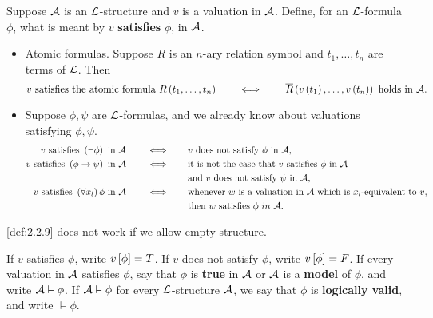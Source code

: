 \begin{definition}
\label{def:2.2.9}
Suppose $ \AA $ is an $ \LL $-structure and $ v $ is a valuation in $ \AA $. Define, for an $ \LL $-formula $ \phi $, what is meant by $ v $ \textbf{satisfies} $ \phi $, in $ \AA $.
\begin{itemize}
\item Atomic formulas. Suppose $ R $ is an $ n $-ary relation symbol and $ t_1, \dots, t_n $ are terms of $ \LL $. Then
$$ v \ \text{satisfies the atomic formula} \ R\rb{t_1, \dots, t_n} \qquad \iff \qquad \overline{R}\rb{v\rb{t_1}, \dots, v\rb{t_n}} \ \text{holds in} \ \AA. $$
\item Suppose $ \phi, \psi $ are $ \LL $-formulas, and we already know about valuations satisfying $ \phi, \psi $.
\begin{align*}
v \ \text{satisfies} \ \notb{\phi} \ \text{in} \ \AA \qquad \iff \qquad & v \ \text{does not satisfy} \ \phi \ \text{in} \ \AA, \\
v \ \text{satisfies} \ \impb{\phi}{\psi} \ \text{in} \ \AA \qquad \iff \qquad & \text{it is not the case that} \ v \ \text{satisfies} \ \phi \ \text{in} \ \AA \\
& \text{and} \ v \ \text{does not satisfy} \ \psi \ \text{in} \ \AA, \\
v \ \text{satisfies} \ \fab{x_l}\phi \ \text{in} \ \AA \qquad \iff \qquad & \text{whenever} \ w \ \text{is a valuation in} \ \AA \ \text{which is} \ x_l \text{-equivalent to} \ v, \\
& \text{then} \ w \ \text{satisfies} \ \phi \ in \ \AA.
\end{align*}
\end{itemize}
\end{definition}


\begin{remark2}
\ref{def:2.2.9} does not work if we allow empty structure.
\end{remark2}

\begin{notation2}
If $ v $ satisfies $ \phi $, write $ v\sb{\phi} = T $. If $ v $ does not satisfy $ \phi $, write $ v\sb{\phi} = F $. If every valuation in $ \AA $ satisfies $ \phi $, say that $ \phi $ is \textbf{true} in $ \AA $ or $ \AA $ is a \textbf{model} of $ \phi $, and write $ \AA \vDash \phi $. If $ \AA \vDash \phi $ for every $ \LL $-structure $ \AA $, we say that $ \phi $ is \textbf{logically valid}, and write $ \vDash \phi $.
\end{notation2}

